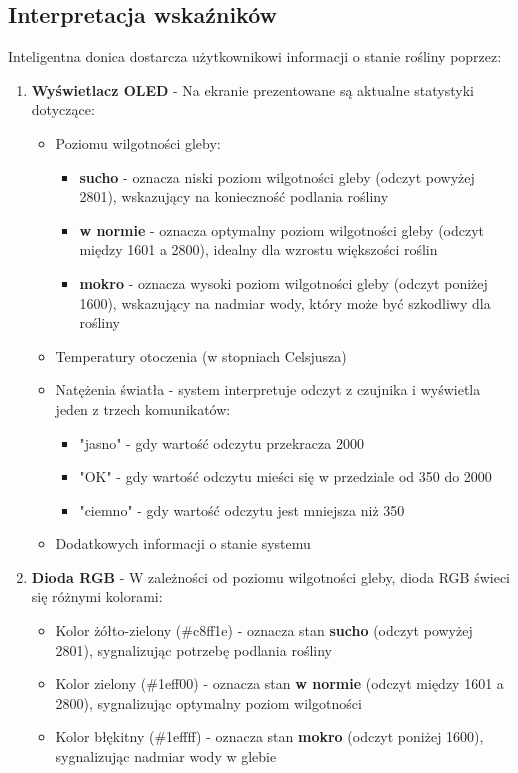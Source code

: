 \documentclass{article}
\begin{document}
\subsection{Interpretacja wskaźników}
Inteligentna donica dostarcza użytkownikowi informacji o stanie rośliny poprzez:
\begin{enumerate} 
     \item \textbf{Wyświetlacz OLED} - Na ekranie prezentowane są aktualne statystyki dotyczące: 
     \begin{itemize} 
         \item Poziomu wilgotności gleby:
             \begin{itemize}
                \label{sec:wykorzystanie_ADC}
                 \item \textbf{sucho} - oznacza niski poziom wilgotności gleby (odczyt powyżej 2801), wskazujący na konieczność podlania rośliny
                 \item \textbf{w normie} - oznacza optymalny poziom wilgotności gleby (odczyt między 1601 a 2800), idealny dla wzrostu większości roślin
                 \item \textbf{mokro} - oznacza wysoki poziom wilgotności gleby (odczyt poniżej 1600), wskazujący na nadmiar wody, który może być szkodliwy dla rośliny
             \end{itemize}
         \item Temperatury otoczenia (w stopniach Celsjusza) 
         \item Natężenia światła - system interpretuje odczyt z czujnika i wyświetla jeden z trzech komunikatów:
         \begin{itemize}
             \item "jasno" - gdy wartość odczytu przekracza 2000
             \item "OK" - gdy wartość odczytu mieści się w przedziale od 350 do 2000
             \item "ciemno" - gdy wartość odczytu jest mniejsza niż 350
         \end{itemize}
         \item Dodatkowych informacji o stanie systemu 
     \end{itemize} 
     
     \item \textbf{Dioda RGB} - W zależności od poziomu wilgotności gleby, dioda RGB świeci się różnymi kolorami: 
     \begin{itemize} 
         \item Kolor żółto-zielony (\#c8ff1e) - oznacza stan \textbf{sucho} (odczyt powyżej 2801), sygnalizując potrzebę podlania rośliny
         \item Kolor zielony (\#1eff00) - oznacza stan \textbf{w normie} (odczyt między 1601 a 2800), sygnalizując optymalny poziom wilgotności
         \item Kolor błękitny (\#1effff) - oznacza stan \textbf{mokro} (odczyt poniżej 1600), sygnalizując nadmiar wody w glebie
     \end{itemize} 
 \end{enumerate}
\end{document}
